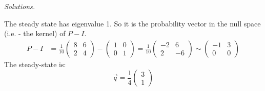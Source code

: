     \ifnum {} {\color{DarkBlue} \textit{Solutions.} 
    
        The steady state has eigenvalue 1. So it is the probability vector in the null space (i.e. - the kernel) of $P-I$. 
        \begin{align} 
            P-I &= \frac{1}{10} \begin{pmatrix} 8 & 6 \\ 2 & 4\end{pmatrix} - \begin{pmatrix} 1&0\\0&1 \end{pmatrix} = \frac{1}{10}\begin{pmatrix}-2&6\\2&-6 \end{pmatrix} \sim \begin{pmatrix}-1&3\\0&0 \end{pmatrix}
        \end{align}
        The steady-state is: 
        $$ \vec q = \frac{1}{4}\begin{pmatrix}3\\1 \end{pmatrix}$$
        } 
    \fi
\fi